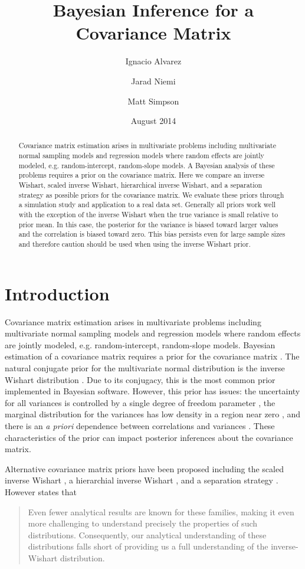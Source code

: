 \documentclass[12pt]{article}
\title{Bayesian Inference for a Covariance Matrix}
\author[1]{Ignacio Alvarez }
\author[1]{Jarad Niemi }
\author[2]{ Matt Simpson}
\affil[1]{Department of Statistics, Iowa State University}
\affil[2]{Department of Statistics and Department of Economics, Iowa State University}
\date{August 2014}
\begin{document}
 
\maketitle 


\begin{abstract}
Covariance matrix estimation arises in multivariate problems including multivariate normal sampling models and regression models where random effects are jointly modeled, e.g. random-intercept, random-slope models. A Bayesian analysis of these problems requires a prior on the covariance matrix. Here we compare an inverse Wishart, scaled inverse Wishart, hierarchical inverse Wishart, and a separation strategy as possible priors for the covariance matrix. We evaluate these priors through a simulation study and application to a real data set. Generally all priors work well with the exception of the inverse Wishart when the true variance is small relative to prior mean. In this case, the posterior for the variance is biased toward larger values and the correlation is biased toward zero. This bias persists even for large sample sizes and therefore caution should be used when using the inverse Wishart prior.
\end{abstract}


\section{Introduction} 

Covariance matrix estimation arises in multivariate problems including multivariate normal sampling models and regression models where random effects are jointly modeled, e.g. random-intercept, random-slope models. Bayesian estimation of a covariance matrix requires a prior for the covariance matrix . The natural conjugate prior for the multivariate normal distribution is the inverse Wishart distribution \citep{barnard2000}. Due to its conjugacy, this is the most common prior implemented in Bayesian software. However, this prior has issues: the uncertainty for all variances is controlled by a single degree of freedom parameter \citep{bda2013}, the marginal distribution for the variances has low density in a region near zero \citep{gelman2006prior}, and there is an \emph{a priori} dependence between correlations and variances \citep{visualize}. These characteristics of the prior can impact posterior inferences about the covariance matrix. 

Alternative covariance matrix priors have been proposed including the scaled inverse Wishart \citep{odomain}, a hierarchial inverse Wishart \citep{huang2013simple}, and a separation strategy \citep{barnard2000}. However \citep{visualize} states that 
\begin{quote}
Even fewer analytical results are known for these families, making it even more challenging to understand precisely the properties of such distributions. Consequently, our analytical understanding of these distributions falls short of providing us a full understanding of the inverse-Wishart distribution.
 \end{quote}
 
\end{document}
